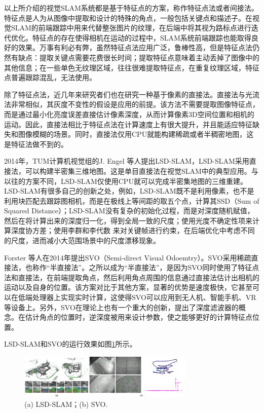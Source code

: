 以上所介绍的视觉SLAM系统都是基于特征点的方案，称作特征点法或者间接法。特征点是人为从图像中提取和设计的特殊的角点，一般包括关键点和描述子。在视觉SLAM的前端跟踪中用来代替整张图片的纹理，在后端中将其视为路标点进行迭代优化。特征点的存在使得相机在运动的过程中，SLAM系统前端跟踪也能取得良好的效果。万事有利必有弊，虽然特征点法应用广泛，鲁棒性高，但是特征点法仍然有缺点：提取关键点需要花费很长时间；提取特征点意味着主动丢掉了图像中的其他信息；在一些单色无纹理区域，往往很难提取特征点，在重复纹理区域，特征点普遍跟踪混乱，无法使用。

除了特征点法，近几年来研究者们也在研究一种基于像素的直接法。直接法与光流法非常相似，其灰度不变性的假设是应用的前提。该方法不需要提取图像特征点，而是通过最小化亮度误差直接估计像素深度，从而计算像素3D空间位置和相机的运动。因此，直接法相比于特征点法在计算速度上有很大提升，并且能适应特征缺失和图像模糊的场景。同时，直接法仅用CPU就能构建稀疏或者半稠密地图，这是特征法做不到的。


2014年，TUM计算机视觉组的J. Engel 等人提出LSD-SLAM，LSD-SLAM采用直接法，可以构建半密集三维地图。这是单目直接法在视觉SLAM中的典型应用。与以往的方案不同，LSD-SLAM仅使用CPU就可以完成半密集地图的三维重建。LSD-SLAM有很多自己的创新之处，例如，LSD-SLAM既不是利用像素，也不是利用块匹配去跟踪图相机，而是在极线上等间距的取五个点，计算其SSD（Sum of Squared Distance）；LSD-SLAM没有复杂的初始化过程，而是对深度随机赋值，然后在将计算出来的深度归一化，得到全局一致的尺度；使用光度不确定性项来计算深度协方差；使用李群和李代数 来对关键帧进行约束，在后端优化中考虑不同的尺度，进而减小大范围场景中的尺度漂移现象。

Forster 等人在2014年提出SVO（Semi-direct Visual Odoemtry）。SVO采用稀疏直接法，也称作“半直接法”。之所以成为“半直接法”，是因为SVO同时使用了特征点法和直接法，在前端提取角点，然后利用角点周围的信息通过直接法估计出相机的运动以及自身的位置。该方案对比于其他方案，显著的优势是速度极快，它甚至可以在低端处理器上实现实时计算，这使得SVO可以应用到无人机、智能手机、VR等设备上。另外，SVO在理论上也有一个重大的创新，提出了深度滤波器的概念。在估计角点的位置时，逆深度被用来设计参数，使之能够更好的计算特征点位置。

LSD-SLAM和SVO的运行效果如图\ref{fig1_2}所示。

\begin{figure}[h]\setlength{\belowcaptionskip}{-12pt}
	\centering
	\includegraphics[width=0.75\textwidth]{figures/chapter1/fig1_2}
	\caption{(a) LSD-SLAM；(b) SVO.}\label{fig1_2}
\end{figure}

